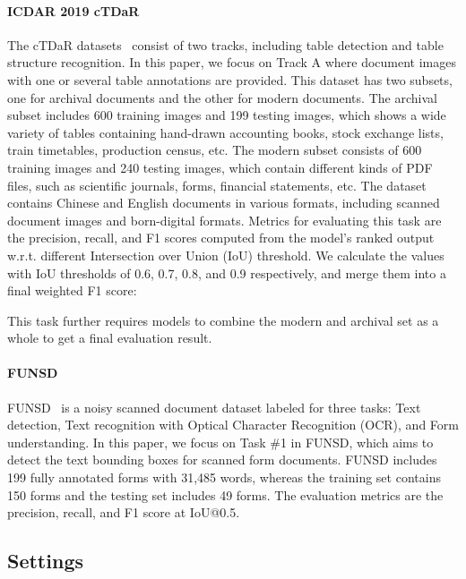 \documentclass[sigconf]{acmart}
\begin{document}
\paragraph{ICDAR 2019 cTDaR}
The cTDaR datasets~\citep{8978120} consist of two tracks, including table detection and table structure recognition. In this paper, we  focus on Track A where document images with one or several table annotations are provided. This dataset has two subsets, one for archival documents and the other for modern documents. The archival subset includes 600 training images and 199 testing images, which shows a wide variety of tables containing hand-drawn accounting books, stock exchange lists, train timetables, production census, etc. The modern subset consists of 600 training images and 240 testing images, which contain different kinds of PDF files, such as scientific journals, forms, financial statements, etc. The dataset contains Chinese and English documents in various formats, including scanned document images and born-digital formats. Metrics for evaluating this task are the precision, recall, and F1 scores computed from the model’s ranked output w.r.t. different Intersection over Union (IoU) threshold. We calculate the values with IoU thresholds of 0.6, 0.7, 0.8, and 0.9 respectively, and merge them into a final weighted F1 score: 


This task further requires models to combine the modern and archival set as a whole to get a final evaluation result.


\paragraph{FUNSD}

FUNSD~\citep{Jaume2019FUNSDAD} is a noisy scanned document dataset labeled for three tasks: Text detection, Text recognition with Optical Character Recognition (OCR), and Form understanding. In this paper, we focus on Task \#1 in FUNSD, which aims to detect the text bounding boxes for scanned form documents. FUNSD includes 199 fully annotated forms with 31,485 words, whereas the training set contains 150 forms and the testing set includes 49 forms. The evaluation metrics are the precision, recall, and F1 score at IoU@0.5.

 
\subsection{Settings}
\end{document}
